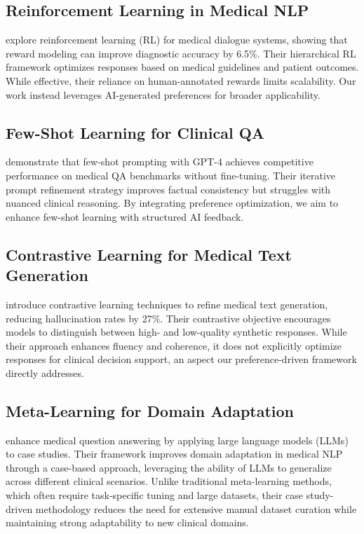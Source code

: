 \documentclass[11pt,a4paper]{article}
\begin{document}
\subsection{Reinforcement Learning in Medical NLP}\citet{liu2023reviewreinforcementlearningnatural} explore reinforcement learning (RL) for medical dialogue systems, showing that reward modeling can improve diagnostic accuracy by 6.5\%. Their hierarchical RL framework optimizes responses based on medical guidelines and patient outcomes. While effective, their reliance on human-annotated rewards limits scalability. Our work instead leverages AI-generated preferences for broader applicability.

\subsection{Few-Shot Learning for Clinical QA}\citet{zhang-etal-2023-ds4dh} demonstrate that few-shot prompting with GPT-4 achieves competitive performance on medical QA benchmarks without fine-tuning. Their iterative prompt refinement strategy improves factual consistency but struggles with nuanced clinical reasoning. By integrating preference optimization, we aim to enhance few-shot learning with structured AI feedback.

\subsection{Contrastive Learning for Medical Text Generation}\citet{wang2022medclipcontrastivelearningunpaired} introduce contrastive learning techniques to refine medical text generation, reducing hallucination rates by 27\%. Their contrastive objective encourages models to distinguish between high- and low-quality synthetic responses. While their approach enhances fluency and coherence, it does not explicitly optimize responses for clinical decision support, an aspect our preference-driven framework directly addresses.

\subsection{Meta-Learning for Domain Adaptation} \citet{yang2025llmmedqaenhancingmedicalquestion} enhance medical question answering by applying large language models (LLMs) to case studies. Their framework improves domain adaptation in medical NLP through a case-based approach, leveraging the ability of LLMs to generalize across different clinical scenarios. Unlike traditional meta-learning methods, which often require task-specific tuning and large datasets, their case study-driven methodology reduces the need for extensive manual dataset curation while maintaining strong adaptability to new clinical domains.
\end{document}

